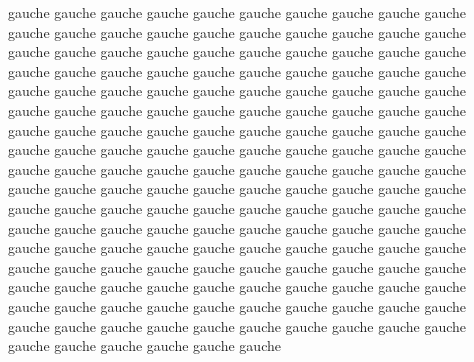 \documentclass[openany]{book}
\begin{document}
\begin{pages}
\begin{Rightside}
\endnumbering  
\end{Rightside}

\end{pages}

\Pages

\begin{pages}

\begin{Leftside}
  \beginnumbering



\pstart
gauche gauche gauche gauche gauche gauche gauche gauche gauche gauche
gauche gauche gauche gauche gauche gauche gauche gauche gauche gauche
gauche gauche gauche gauche gauche gauche gauche gauche gauche gauche
gauche gauche gauche gauche gauche gauche gauche gauche gauche gauche
gauche gauche gauche gauche gauche gauche gauche gauche gauche gauche
gauche gauche gauche gauche gauche gauche gauche gauche gauche gauche
gauche gauche gauche gauche gauche gauche gauche gauche gauche gauche
gauche gauche gauche gauche gauche gauche gauche gauche gauche gauche
gauche gauche gauche gauche gauche gauche gauche gauche gauche gauche
gauche gauche gauche gauche gauche gauche gauche gauche gauche gauche
gauche gauche gauche gauche gauche gauche gauche gauche gauche gauche
gauche gauche gauche gauche gauche gauche gauche gauche gauche gauche
gauche gauche gauche gauche gauche gauche gauche gauche gauche gauche
gauche gauche gauche gauche gauche gauche gauche gauche gauche gauche
gauche gauche gauche gauche gauche gauche gauche gauche gauche gauche
gauche gauche gauche gauche gauche gauche gauche gauche gauche gauche
gauche gauche gauche gauche gauche gauche gauche gauche gauche gauche
gauche gauche gauche gauche gauche gauche
\pend

  \endnumbering
\end{Leftside}

\begin{Rightside}
\beginnumbering




\end{Rightside}
\end{pages}
\end{document}
